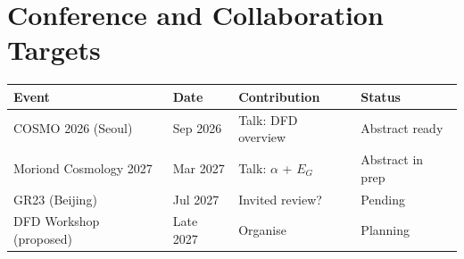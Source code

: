 \documentclass[11pt,a4paper]{article}
\begin{document}
\section{Conference and Collaboration Targets}

\begin{center}
\begin{tabular}{llll}
\toprule
\textbf{Event} & \textbf{Date} & \textbf{Contribution} & \textbf{Status} \\
\midrule
COSMO 2026 (Seoul) & Sep 2026 & Talk: DFD overview & Abstract ready \\
Moriond Cosmology 2027 & Mar 2027 & Talk: $\alpha$ + $E_G$ & Abstract in prep \\
GR23 (Beijing) & Jul 2027 & Invited review? & Pending \\
DFD Workshop (proposed) & Late 2027 & Organise & Planning \\
\bottomrule
\end{tabular}
\end{center}
\end{document}

